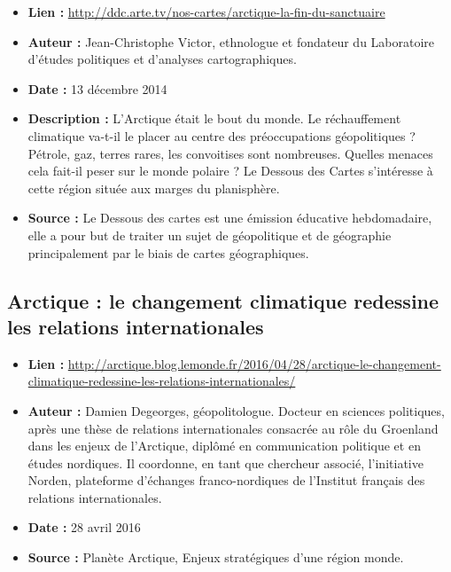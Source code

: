 \documentclass[8pt]{article}
\begin{document}
\begin{itemize}
	\item \textbf{Lien : }  \url{http://ddc.arte.tv/nos-cartes/arctique-la-fin-du-sanctuaire} 
	\item \textbf{Auteur : }  Jean-Christophe Victor, ethnologue et fondateur du Laboratoire d’études politiques et d’analyses cartographiques.
	\item \textbf{Date : } 13 décembre 2014
	\item \textbf{Description : } L’Arctique était le bout du monde. Le réchauffement climatique va-t-il le placer au centre des préoccupations géopolitiques ? Pétrole, gaz, terres rares, les convoitises sont nombreuses. Quelles menaces cela fait-il peser sur le monde polaire ? Le Dessous des Cartes s’intéresse à cette région située aux marges du planisphère.
	\item \textbf{Source : } Le Dessous des cartes est une émission éducative hebdomadaire, elle a pour but de traiter un sujet de géopolitique et de géographie principalement par le biais de cartes géographiques.
\end{itemize}

\subsection{Arctique : le changement climatique redessine les relations internationales}

\begin{itemize}
	\item \textbf{Lien : }  \url{http://arctique.blog.lemonde.fr/2016/04/28/arctique-le-changement-climatique-redessine-les-relations-internationales/} 
	\item \textbf{Auteur : }  Damien Degeorges, géopolitologue. Docteur en sciences politiques, après une thèse de relations internationales consacrée au rôle du Groenland dans les enjeux de l’Arctique, diplômé en communication politique et en études nordiques. Il coordonne, en tant que chercheur associé, l’initiative Norden, plateforme d’échanges franco-nordiques de l’Institut français des relations internationales.
	\item \textbf{Date : } 28 avril 2016
	\item \textbf{Source : } Planète Arctique, Enjeux stratégiques d'une région monde.
\end{itemize}
\end{document}
